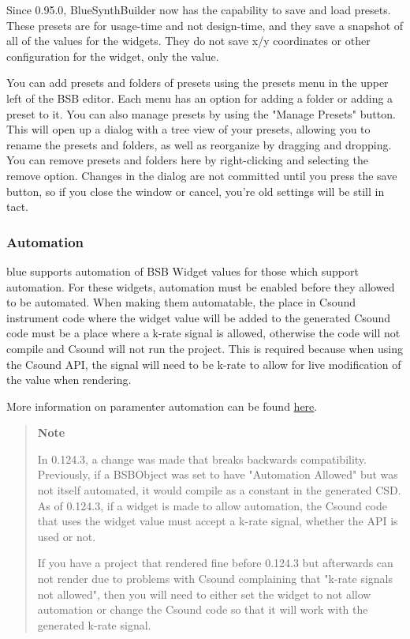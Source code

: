Since 0.95.0, BlueSynthBuilder now has the capability to save and load
presets. These presets are for usage-time and not design-time, and they
save a snapshot of all of the values for the widgets. They do not save
x/y coordinates or other configuration for the widget, only the value.

You can add presets and folders of presets using the presets menu in the
upper left of the BSB editor. Each menu has an option for adding a
folder or adding a preset to it. You can also manage presets by using
the "Manage Presets" button. This will open up a dialog with a tree view
of your presets, allowing you to rename the presets and folders, as well
as reorganize by dragging and dropping. You can remove presets and
folders here by right-clicking and selecting the remove option. Changes
in the dialog are not committed until you press the save button, so if
you close the window or cancel, you're old settings will be still in
tact.

\subsubsection{Automation}\label{bsbAutomation}

blue supports automation of BSB Widget values for those which support
automation. For these widgets, automation must be enabled before they
allowed to be automated. When making them automatable, the place in
Csound instrument code where the widget value will be added to the
generated Csound code must be a place where a k-rate signal is allowed,
otherwise the code will not compile and Csound will not run the project.
This is required because when using the Csound API, the signal will need
to be k-rate to allow for live modification of the value when rendering.

More information on paramenter automation can be found
\protect\hyperlink{parameterAutomation}{here}.

\begin{quote}
\textbf{Note}

In 0.124.3, a change was made that breaks backwards compatibility.
Previously, if a BSBObject was set to have "Automation Allowed" but was
not itself automated, it would compile as a constant in the generated
CSD. As of 0.124.3, if a widget is made to allow automation, the Csound
code that uses the widget value must accept a k-rate signal, whether the
API is used or not.

If you have a project that rendered fine before 0.124.3 but afterwards
can not render due to problems with Csound complaining that "k-rate
signals not allowed", then you will need to either set the widget to not
allow automation or change the Csound code so that it will work with the
generated k-rate signal.
\end{quote}


